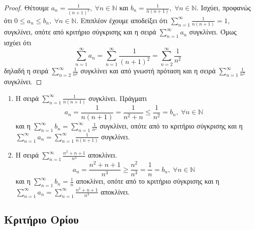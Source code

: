 \documentclass[main.tex]{subfiles}
\begin{document}

\begin{proof}
\item {}
    Θέτουμε $ a_{n} = \frac{1}{(n+1)^{2}}, \; \forall n \in \mathbb{N} $ και 
    $ b_{n} = \frac{1}{n(n+1)}, \; \forall n \in \mathbb{N} $. Ισχύει, προφανώς ότι
    $ 0 \leq a_{n} \leq b_{n}, \; \forall n \in \mathbb{N} $. Επιπλέον έχουμε αποδείξει
    ότι $ \sum_{n=1}^{\infty} \frac{1}{n(n+1)} = 1 $, συγκλίνει, οπότε από κριτήριο 
    σύγκρισης και η σειρά 
    $ \sum_{n=1}^{\infty} a_{n} $ συγκλίνει. Όμως ισχύει ότι
    \[
        \sum_{n=1}^{\infty} a_{n} = \sum_{n=1}^{\infty} \frac{1}{(n+1)^{2}} = 
        \sum_{n=2}^{\infty} \frac{1}{n^{2}} 
    \] 
    δηλαδή η σειρά $ \sum_{n=2}^{\infty} \frac{1}{n^{2}} $ συγκλίνει και από γνωστή 
    πρόταση και η σειρά $ \sum_{n=1}^{\infty} \frac{1}{n^{2}} $ συγκλίνει.
\end{proof}

\begin{examples}
\item {}
    \begin{enumerate}
        \item Η σειρά $ \sum_{n=1}^{\infty} \frac{1}{n(n+1)} $ συγκλίνει. Πράγματι
            \[
                a_{n}= \frac{1}{n(n+1)} = \frac{1}{n^{2}+n} \leq \frac{1}{n^{2}} = 
                b_{n}, \; \forall n \in \mathbb{N}
            \] 
            και η $ \sum_{n=1}^{\infty} b_{n} = \sum_{n=1}^{\infty} \frac{1}{n^{2}} $ 
            συγκλίνει, οπότε από το κριτήριο 
            σύγκρισης και η $ \sum_{n=1}^{\infty} a_{n} = \sum_{n=1}^{\infty} 
            \frac{1}{n(n+1)} $ συγκλίνει. 

        \item Η σειρά $ \sum_{n=1}^{\infty} \frac{n^{2}+n+1}{n^{3}} $ αποκλίνει. 
            \[
                a_{n} = \frac{n^{2}+n+1}{n^{3}} \geq \frac{n^{2}}{n^{3}} = \frac{1}{n} 
                = b_{n}, \; \forall n \in \mathbb{N} 
            \] 
            και η $ \sum_{n=1}^{\infty} b_{n} = \frac{1}{n} $ αποκλίνει, οπότε από 
            το κριτήριο σύγκρισης και η $ \sum_{n=1}^{\infty} a_{n} = 
            \sum_{n=1}^{\infty} \frac{n^{2}+n+1}{n^{3}} $ αποκλίνει.
    \end{enumerate}
\end{examples}

\subsection{Κριτήριο Ορίου}
\end{document}
